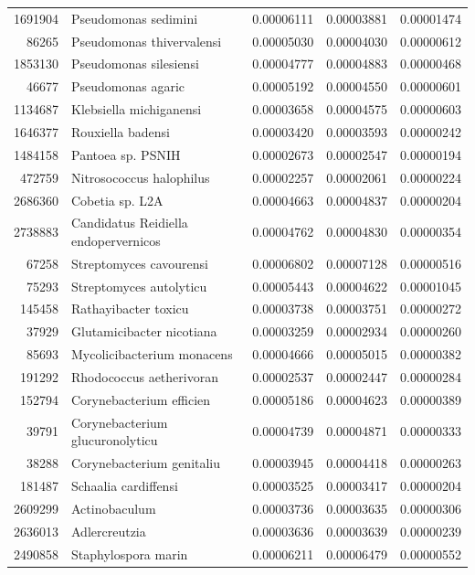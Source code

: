\begin{table}[ht]
\begin{tabular}{rlrrr}
  1691904 & Pseudomonas sedimini & 0.00006111 & 0.00003881 & 0.00001474 \\ 
  86265 & Pseudomonas thivervalensi & 0.00005030 & 0.00004030 & 0.00000612 \\ 
  1853130 & Pseudomonas silesiensi & 0.00004777 & 0.00004883 & 0.00000468 \\ 
  46677 & Pseudomonas agaric & 0.00005192 & 0.00004550 & 0.00000601 \\ 
  1134687 & Klebsiella michiganensi & 0.00003658 & 0.00004575 & 0.00000603 \\ 
  1646377 & Rouxiella badensi & 0.00003420 & 0.00003593 & 0.00000242 \\ 
  1484158 & Pantoea sp. PSNIH & 0.00002673 & 0.00002547 & 0.00000194 \\ 
  472759 & Nitrosococcus halophilus & 0.00002257 & 0.00002061 & 0.00000224 \\ 
  2686360 & Cobetia sp. L2A & 0.00004663 & 0.00004837 & 0.00000204 \\ 
  2738883 & Candidatus Reidiella endopervernicos & 0.00004762 & 0.00004830 & 0.00000354 \\ 
  67258 & Streptomyces cavourensi & 0.00006802 & 0.00007128 & 0.00000516 \\ 
  75293 & Streptomyces autolyticu & 0.00005443 & 0.00004622 & 0.00001045 \\ 
  145458 & Rathayibacter toxicu & 0.00003738 & 0.00003751 & 0.00000272 \\ 
  37929 & Glutamicibacter nicotiana & 0.00003259 & 0.00002934 & 0.00000260 \\ 
  85693 & Mycolicibacterium monacens & 0.00004666 & 0.00005015 & 0.00000382 \\ 
  191292 & Rhodococcus aetherivoran & 0.00002537 & 0.00002447 & 0.00000284 \\ 
  152794 & Corynebacterium efficien & 0.00005186 & 0.00004623 & 0.00000389 \\ 
  39791 & Corynebacterium glucuronolyticu & 0.00004739 & 0.00004871 & 0.00000333 \\ 
  38288 & Corynebacterium genitaliu & 0.00003945 & 0.00004418 & 0.00000263 \\ 
  181487 & Schaalia cardiffensi & 0.00003525 & 0.00003417 & 0.00000204 \\ 
  2609299 & Actinobaculum & 0.00003736 & 0.00003635 & 0.00000306 \\ 
  2636013 & Adlercreutzia & 0.00003636 & 0.00003639 & 0.00000239 \\ 
  2490858 & Staphylospora marin & 0.00006211 & 0.00006479 & 0.00000552 \\ 

\end{tabular}
\end{table}
